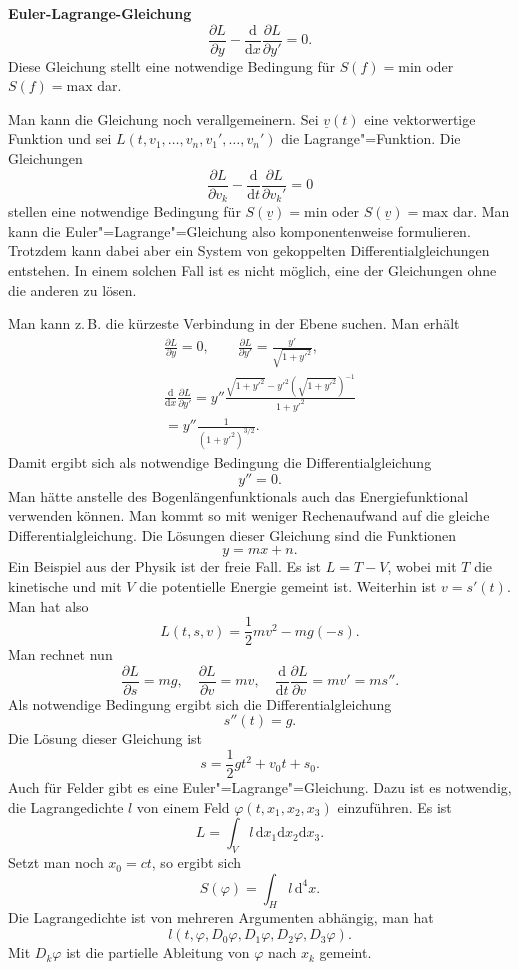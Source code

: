 \documentclass[a4paper,10pt,fleqn,twocolumn,twoside]{article}
\begin{document}
\textbf{Euler-Lagrange-Gleichung}
\[\frac{\partial L}{\partial y}
-\frac{\mathrm d}{\mathrm dx}\frac{\partial L}{\partial y'}
=0.\]
Diese Gleichung stellt eine notwendige Bedingung für
$S(f)=\mathrm{min}$ oder $S(f)=\mathrm{max}$ dar.

Man kann die Gleichung noch verallgemeinern. Sei $\underline v(t)$
eine vektorwertige Funktion und sei
$L(t,v_1,\ldots,v_n,v_1',\ldots,v_n')$ die Lagrange"=Funktion.
Die Gleichungen
\[\frac{\partial L}{\partial v_k}
-\frac{\mathrm d}{\mathrm dt}\frac{\partial L}{\partial v_k'}
=0\]
stellen eine notwendige Bedingung für
$S(\underline v)=\mathrm{min}$ oder
$S(\underline v)=\mathrm{max}$ dar.
Man kann die Euler"=Lagrange"=Gleichung also komponentenweise
formulieren. Trotzdem kann dabei aber ein System von gekoppelten
Differentialgleichungen entstehen. In einem solchen Fall ist es
nicht möglich, eine der Gleichungen ohne die anderen zu lösen.

Man kann z.\,B. die kürzeste Verbindung in der Ebene suchen. Man erhält
\begin{gather*}
\frac{\partial L}{\partial y} = 0,\qquad
\frac{\partial L}{\partial y'} = \frac{y'}{\sqrt{1+y'^2}},\\
\frac{\mathrm d}{\mathrm dx}\frac{\partial L}{\partial y'}
= y''\frac{\sqrt{1+y'^2}-y'^2(\sqrt{1+y'^2})^{-1}}{1+y'^2}\\
= y''\frac{1}{(1+y'^2)^{3/2}}.
\end{gather*}
Damit ergibt sich als notwendige Bedingung die Differentialgleichung
\[y''=0.\]
Man hätte anstelle des Bogenlängenfunktionals auch das
Energiefunktional verwenden können. Man kommt so mit weniger
Rechenaufwand auf die gleiche Differentialgleichung.
Die Lösungen dieser Gleichung sind die Funktionen
\[y=mx+n.\]
Ein Beispiel aus der Physik ist der freie Fall. Es ist $L=T-V$,
wobei mit $T$ die kinetische und mit $V$ die potentielle Energie
gemeint ist. Weiterhin ist $v=s'(t)$. Man hat also
\[L(t,s,v) = \frac{1}{2}mv^2 - mg(-s).\]
Man rechnet nun
\[
\frac{\partial L}{\partial s} = mg,\quad
\frac{\partial L}{\partial v} = mv,\quad
\frac{\mathrm d}{\mathrm dt}\frac{\partial L}{\partial v}
= mv' = ms''.
\]
Als notwendige Bedingung ergibt sich die Differentialgleichung
\[s''(t) = g.\]
Die Lösung dieser Gleichung ist
\[s=\frac{1}{2}gt^2+v_0t+s_0.\]
%
Auch für Felder gibt es eine Euler"=Lagrange"=Gleichung. Dazu ist es
notwendig, die Lagrangedichte $l$ von einem Feld
$\varphi(t,x_1,x_2,x_3)$ einzuführen. Es ist
\[L = \int_V l\,\mathrm dx_1\mathrm dx_2\mathrm dx_3.\]
Setzt man noch $x_0=ct$, so ergibt sich
\[S(\varphi) = \int_H l\,\mathrm d^4x.\]
Die Lagrangedichte ist von mehreren Argumenten abhängig, man hat
\[l(t,\varphi,D_0\varphi, D_1\varphi, D_2\varphi, D_3\varphi).\]
Mit $D_k\varphi$ ist die partielle Ableitung von $\varphi$
nach $x_k$ gemeint.
\end{document}
